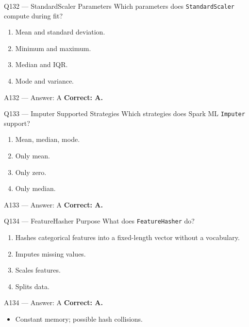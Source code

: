 \documentclass[aspectratio=169,9pt]{beamer}
\begin{document}
	\begin{frame}{Q132 --- StandardScaler Parameters}
		Which parameters does \texttt{StandardScaler} compute during fit?
		\begin{enumerate}[label=\Alph*.]
			\item Mean and standard deviation.
			\item Minimum and maximum.
			\item Median and IQR.
			\item Mode and variance.
		\end{enumerate}
	\end{frame}
	
	\begin{frame}{A132 --- Answer: A}
		\textbf{Correct: A.}
	\end{frame}
	
	\begin{frame}{Q133 --- Imputer Supported Strategies}
		Which strategies does Spark ML \texttt{Imputer} support?
		\begin{enumerate}[label=\Alph*.]
			\item Mean, median, mode.
			\item Only mean.
			\item Only zero.
			\item Only median.
		\end{enumerate}
	\end{frame}
	
	\begin{frame}{A133 --- Answer: A}
		\textbf{Correct: A.}
	\end{frame}
	
	\begin{frame}{Q134 --- FeatureHasher Purpose}
		What does \texttt{FeatureHasher} do?
		\begin{enumerate}[label=\Alph*.]
			\item Hashes categorical features into a fixed-length vector without a vocabulary.
			\item Imputes missing values.
			\item Scales features.
			\item Splits data.
		\end{enumerate}
	\end{frame}
	
	\begin{frame}{A134 --- Answer: A}
		\textbf{Correct: A.}
		\begin{itemize}
			\item Constant memory; possible hash collisions.
		\end{itemize}
	\end{frame}
	
\end{document}
